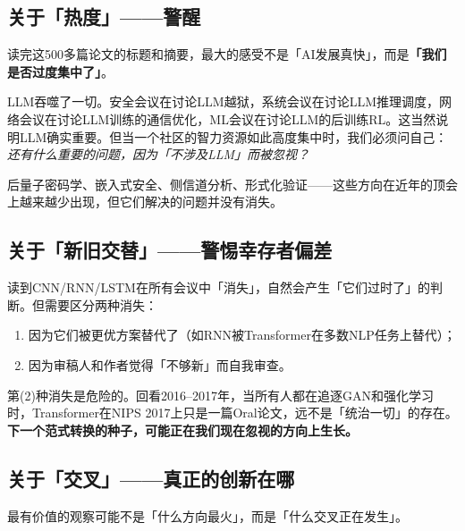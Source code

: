 \documentclass[12pt,a4paper]{ctexart}
\begin{document}
\subsection{关于「热度」——警醒}

读完这500多篇论文的标题和摘要，最大的感受不是「AI发展真快」，而是\textbf{「我们是否过度集中了」}。

LLM吞噬了一切。安全会议在讨论LLM越狱，系统会议在讨论LLM推理调度，网络会议在讨论LLM训练的通信优化，ML会议在讨论LLM的后训练RL。这当然说明LLM确实重要。但当一个社区的智力资源如此高度集中时，我们必须问自己：\textit{还有什么重要的问题，因为「不涉及LLM」而被忽视？}

后量子密码学、嵌入式安全、侧信道分析、形式化验证——这些方向在近年的顶会上越来越少出现，但它们解决的问题并没有消失。

\subsection{关于「新旧交替」——警惕幸存者偏差}

读到CNN/RNN/LSTM在所有会议中「消失」，自然会产生「它们过时了」的判断。但需要区分两种消失：

\begin{enumerate}[label=(\arabic*)]
    \item 因为它们被更优方案替代了（如RNN被Transformer在多数NLP任务上替代）；
    \item 因为审稿人和作者觉得「不够新」而自我审查。
\end{enumerate}

第(2)种消失是危险的。回看2016--2017年，当所有人都在追逐GAN和强化学习时，Transformer在NIPS 2017上只是一篇Oral论文，远不是「统治一切」的存在。\textbf{下一个范式转换的种子，可能正在我们现在忽视的方向上生长。}

\subsection{关于「交叉」——真正的创新在哪}

最有价值的观察可能不是「什么方向最火」，而是「什么交叉正在发生」。
\end{document}
